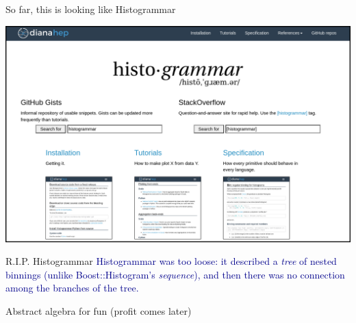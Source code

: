 \documentclass[aspectratio=169]{beamer}
\begin{document}
\begin{frame}{So far, this is looking like Histogrammar}
\vspace{0.08 cm}
\begin{center}
\includegraphics[width=0.9\linewidth]{histogrammar-website.png}
\end{center}
\end{frame}

\begin{frame}{R.I.P. Histogrammar}
\vspace{0.5 cm}
\Large
\textcolor{darkblue}{Histogrammar was too loose: it described a {\it tree} of nested binnings (unlike Boost::Histogram's {\it sequence}), and then there was no connection among the branches of the tree.}

\vspace{1 cm}
\end{frame}

\begin{frame}{Abstract algebra for fun (profit comes later)}





\end{frame}
\end{document}
